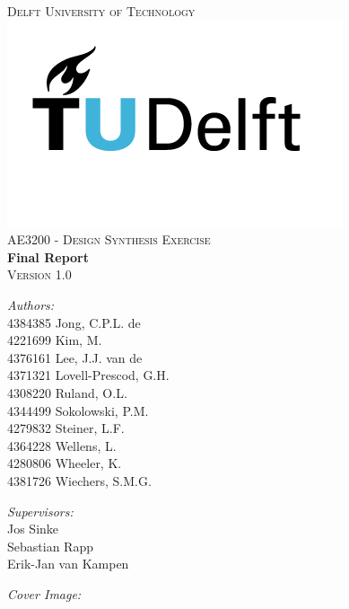 \begin{titlepage}
\begin{center}

\textsc{\LARGE Delft University of Technology}\\[1.5cm]
\includegraphics[scale=0.45]{TU_Delft_logo_RGB.png}\\[0.5cm]
\textsc{\Large AE3200 - Design Synthesis Exercise}\\[0.5cm]
{\huge\textbf{Final Report} \\[.2cm] \Large\textsc{Version 1.0}\\[1.0cm]}

\begin{minipage}[t]{0.4\textwidth}
\begin{flushleft} \large
\emph{Authors:}\\
    4384385  Jong, C.P.L. de\\
    4221699  Kim, M.\\
    4376161  Lee, J.J. van de\\
    4371321  Lovell-Prescod, G.H.\\
    4308220  Ruland, O.L.\\
    4344499  Sokolowski, P.M.\\
    4279832  Steiner, L.F.\\
    4364228  Wellens, L.\\
    4280806  Wheeler, K.\\
    4381726  Wiechers, S.M.G.
    

\end{flushleft}
\end{minipage}
\begin{minipage}[t]{0.4\textwidth}
\begin{flushright} \large
\emph{Supervisors:} \\
    Jos Sinke\\
    Sebastian Rapp\\
    Erik-Jan van Kampen
    
    
\end{flushright}
\end{minipage}
\vfill
\textit{Cover Image:} \\
\small
\url{}

\end{center}
\end{titlepage}
\restoregeometry